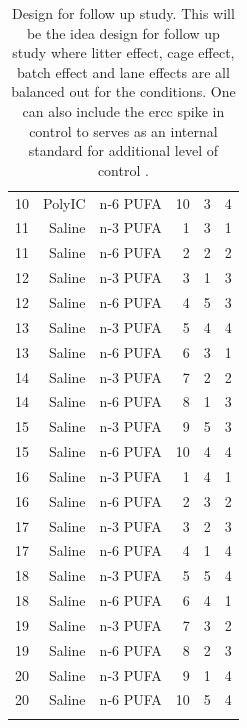\begin{center}
\begin{longtable}[H]{rrrrrr}
			    10    & PolyIC & n-6 PUFA & 10    & 3     & 4 \\
			    11    & Saline & n-3 PUFA & 1     & 3     & 1 \\
			    11    & Saline & n-6 PUFA & 2     & 2     & 2 \\
			    12    & Saline & n-3 PUFA & 3     & 1     & 3 \\
			    12    & Saline & n-6 PUFA & 4     & 5     & 3 \\
			    13    & Saline & n-3 PUFA & 5     & 4     & 4 \\
			    13    & Saline & n-6 PUFA & 6     & 3     & 1 \\
			    14    & Saline & n-3 PUFA & 7     & 2     & 2 \\
			    14    & Saline & n-6 PUFA & 8     & 1     & 3 \\
			    15    & Saline & n-3 PUFA & 9     & 5     & 3 \\
			    15    & Saline & n-6 PUFA & 10    & 4     & 4 \\
			    16    & Saline & n-3 PUFA & 1     & 4     & 1 \\
			    16    & Saline & n-6 PUFA & 2     & 3     & 2 \\
			    17    & Saline & n-3 PUFA & 3     & 2     & 3 \\
			    17    & Saline & n-6 PUFA & 4     & 1     & 4 \\
			    18    & Saline & n-3 PUFA & 5     & 5     & 4 \\
			    18    & Saline & n-6 PUFA & 6     & 4     & 1 \\
			    19    & Saline & n-3 PUFA & 7     & 3     & 2 \\
			    19    & Saline & n-6 PUFA & 8     & 2     & 3 \\
			    20    & Saline & n-3 PUFA & 9     & 1     & 4 \\
			    20    & Saline & n-6 PUFA & 10    & 5     & 4 \\
			\bottomrule
		\caption[Design for Follow Up Study]{
			Design for follow up study.
			This will be the idea design for follow up study where litter effect, cage effect, batch effect and lane effects are all balanced out for the conditions.
			One can also include the \gls{ercc} spike in control to serves as an internal standard for additional level of control \citep{Jiang2011a}.
			}
		\label{tab:bestdesign}%
	\end{longtable}%
\end{center}
